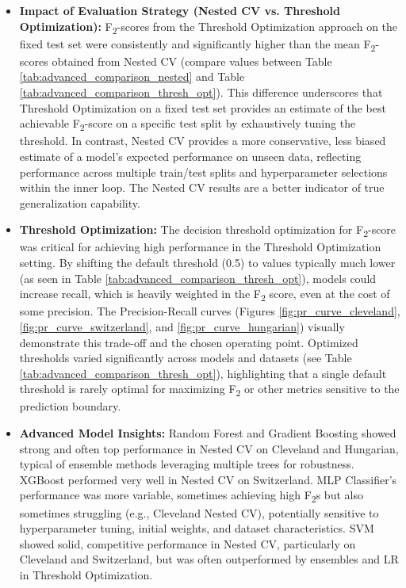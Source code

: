 \documentclass{article}
\begin{document}
\begin{itemize}
    \item \textbf{Impact of Evaluation Strategy (Nested CV vs. Threshold Optimization):} F\textsubscript{2}-scores from the Threshold Optimization approach on the fixed test set were consistently and significantly higher than the mean F\textsubscript{2}-scores obtained from Nested CV (compare values between Table \ref{tab:advanced_comparison_nested} and Table \ref{tab:advanced_comparison_thresh_opt}). This difference underscores that Threshold Optimization on a fixed test set provides an estimate of the best achievable F\textsubscript{2}-score on a specific test split by exhaustively tuning the threshold. In contrast, Nested CV provides a more conservative, less biased estimate of a model's expected performance on unseen data, reflecting performance across multiple train/test splits and hyperparameter selections within the inner loop. The Nested CV results are a better indicator of true generalization capability.
    \item \textbf{Threshold Optimization:} The decision threshold optimization for F\textsubscript{2}-score was critical for achieving high performance in the Threshold Optimization setting. By shifting the default threshold (0.5) to values typically much lower (as seen in Table \ref{tab:advanced_comparison_thresh_opt}), models could increase recall, which is heavily weighted in the F\textsubscript{2} score, even at the cost of some precision. The Precision-Recall curves (Figures \ref{fig:pr_curve_cleveland}, \ref{fig:pr_curve_switzerland}, and \ref{fig:pr_curve_hungarian}) visually demonstrate this trade-off and the chosen operating point. Optimized thresholds varied significantly across models and datasets (see Table \ref{tab:advanced_comparison_thresh_opt}), highlighting that a single default threshold is rarely optimal for maximizing F\textsubscript{2} or other metrics sensitive to the prediction boundary.
    \item \textbf{Advanced Model Insights:} Random Forest and Gradient Boosting showed strong and often top performance in Nested CV on Cleveland and Hungarian, typical of ensemble methods leveraging multiple trees for robustness. XGBoost performed very well in Nested CV on Switzerland. MLP Classifier's performance was more variable, sometimes achieving high F\textsubscript{2}s but also sometimes struggling (e.g., Cleveland Nested CV), potentially sensitive to hyperparameter tuning, initial weights, and dataset characteristics. SVM showed solid, competitive performance in Nested CV, particularly on Cleveland and Switzerland, but was often outperformed by ensembles and LR in Threshold Optimization.

\end{itemize}
\end{document}
